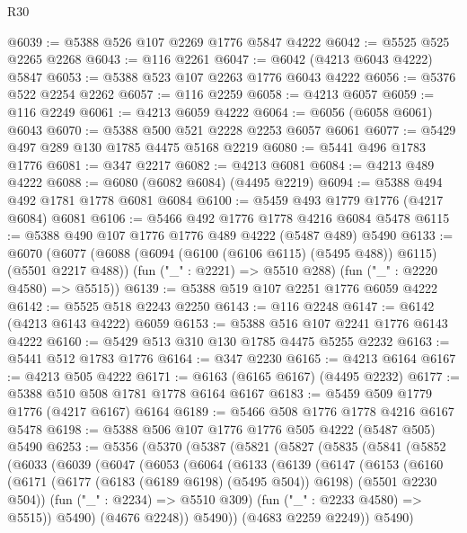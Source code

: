 \begin{lexlean}{R30}
\begin{coremodule}
{{{{{@6039 := @5388 @526 @107 @2269 @1776 @5847 @4222
@6042 := @5525 @525 @2265 @2268
@6043 := @116 @2261
@6047 := @6042 (@4213 @6043 @4222) @5847
@6053 := @5388 @523 @107 @2263 @1776 @6043 @4222
@6056 := @5376 @522 @2254 @2262
@6057 := @116 @2259
@6058 := @4213 @6057
@6059 := @116 @2249
@6061 := @4213 @6059 @4222
@6064 := @6056 (@6058 @6061) @6043
@6070 := @5388 @500 @521 @2228 @2253 @6057 @6061
@6077 := @5429 @497 @289 @130 @1785 @4475 @5168 @2219
@6080 := @5441 @496 @1783 @1776
@6081 := @347 @2217
@6082 := @4213 @6081
@6084 := @4213 @489 @4222
@6088 := @6080 (@6082 @6084) (@4495 @2219)
@6094 := @5388 @494 @492 @1781 @1778 @6081 @6084
@6100 := @5459 @493 @1779 @1776 (@4217 @6084) @6081
@6106 := @5466 @492 @1776 @1778 @4216 @6084 @5478
@6115 := @5388 @490 @107 @1776 @1776 @489 @4222 (@5487 @489) @5490
@6133 := @6070
    (@6077
      (@6088 (@6094 (@6100 (@6106 @6115) (@5495 @488)) @6115) (@5501 @2217 @488))
      (fun ("_" : @2221) => @5510 @288)
      (fun ("_" : @2220 @4580) => @5515))
@6139 := @5388 @519 @107 @2251 @1776 @6059 @4222
@6142 := @5525 @518 @2243 @2250
@6143 := @116 @2248
@6147 := @6142 (@4213 @6143 @4222) @6059
@6153 := @5388 @516 @107 @2241 @1776 @6143 @4222
@6160 := @5429 @513 @310 @130 @1785 @4475 @5255 @2232
@6163 := @5441 @512 @1783 @1776
@6164 := @347 @2230
@6165 := @4213 @6164
@6167 := @4213 @505 @4222
@6171 := @6163 (@6165 @6167) (@4495 @2232)
@6177 := @5388 @510 @508 @1781 @1778 @6164 @6167
@6183 := @5459 @509 @1779 @1776 (@4217 @6167) @6164
@6189 := @5466 @508 @1776 @1778 @4216 @6167 @5478
@6198 := @5388 @506 @107 @1776 @1776 @505 @4222 (@5487 @505) @5490
@6253 := @5356
    (@5370
      (@5387
        (@5821
          (@5827
            (@5835
              (@5841
                (@5852
                  (@6033
                    (@6039
                      (@6047
                        (@6053
                          (@6064
                            (@6133
                              (@6139
                                (@6147
                                  (@6153
                                    (@6160
                                      (@6171
                                        (@6177 (@6183 (@6189 @6198) (@5495 @504)) @6198)
                                        (@5501 @2230 @504))
                                      (fun ("_" : @2234) => @5510 @309)
                                      (fun ("_" : @2233 @4580) => @5515))
                                    @5490)
                                  (@4676 @2248))
                                @5490))
                            (@4683 @2259 @2249))
                          @5490)
}}}}}
\end{coremodule}
\end{lexlean}
